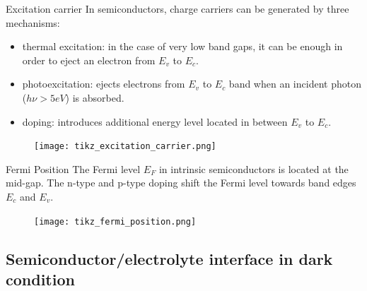 \documentclass[10pt,compress]{beamer}
\begin{document}
    \begin{frame}[allowframebreaks=1.0]{Excitation carrier}
        In semiconductors, charge carriers can be generated by three mechanisms: 
        \begin{itemize}
            \item thermal excitation: in the case of very low band gaps, it can be enough in order 
            to eject an electron from $E_v$ to $E_c$.
            \item photoexcitation: ejects electrons from $E_v$ to $E_c$
            band when an incident photon ($h\nu > 5eV$) is absorbed.
            \item doping: introduces additional energy level located in between $E_v$ to $E_c$.
        \end{itemize}
        
        \begin{figure}[h]
            \centering
            \texttt{[image: tikz\_excitation\_carrier.png]}
            \label{fig_excitation_carrier}
        \end{figure}
    \end{frame}

    \begin{frame}{Fermi Position}
        The Fermi level $E_F$ in intrinsic semiconductors is located at the mid-gap. 
        The n-type and p-type doping shift the Fermi level towards band edges 
        $E_c$ and $E_v$.
        \begin{figure}[H]
            \centering
            \texttt{[image: tikz\_fermi\_position.png]}
            \label{fig_fermi_position}
        \end{figure}
    \end{frame}

\subsection{Semiconductor/electrolyte interface in dark condition}
\end{document}
